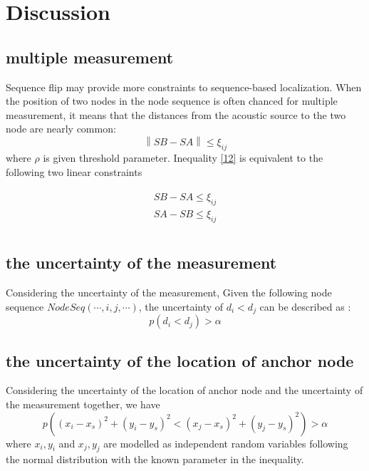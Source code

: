 \section{Discussion}

\subsection{multiple measurement}
 Sequence flip may provide more constraints to sequence-based localization. 
 When the position of two nodes in the node sequence is often chanced for multiple measurement, 
it means that the distances from the acoustic source to the two node are nearly common:
   \begin{equation} \label{12}
 \left\| {SB - SA } \right\| \le \xi _{ij}
  \end{equation}
 where $\rho$ is given threshold parameter. Inequality \eqref{12} is equivalent to the following two linear constraints

 \begin{eqnarray} \label{13}
 \begin{array}{l}
 SB-SA \le \xi _{ij}  \\
  SA-SB \le \xi _{ij}  \\
  \end{array}
 \end{eqnarray}



 \subsection{the uncertainty of the measurement}
 Considering the uncertainty of the measurement,
 Given the following node sequence $NodeSeq( \cdots ,i,j, \cdots )$, the uncertainty of ${d_i} < {d_j}$ can be described as : 
 \begin{equation}
 p({d_i} < {d_j})>\alpha
 \end{equation}

  \subsection{the uncertainty of the location of anchor node}
 Considering the uncertainty of the location of anchor node and the uncertainty of the measurement together, we have
 \begin{equation}
 p((x_i-x_s)^2+(y_i-y_s)^2 < (x_j-x_s)^2+(y_j-y_s)^2)>\alpha
 \end{equation}
 where ${x_i,y_i}$ and ${x_j,y_j}$ are modelled as independent random variables following the normal distribution with the known parameter in the inequality.




